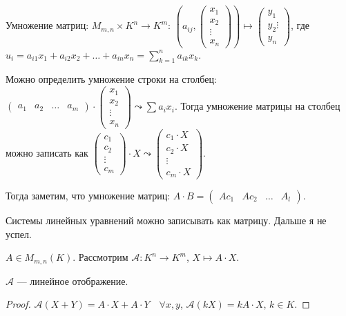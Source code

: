  \begin{definition}
     Умножение матриц: $M_{m, n} \times K^n \to K^m$: $(a_{ij}, \begin{pmatrix} x_1 \\ x_2 \\ \vdots \\ x_n \end{pmatrix}) \mapsto \begin{pmatrix} y_1 \\ y_2 \vdots \\ y_n \end{pmatrix}$, где $u_i = a_{i 1} x_1 + a_{i 2}x_2 + \ldots + a_{in}x_n = \sum\limits_{k=1}^n a_{ik}x_k$.

     Можно определить умножение строки на столбец:  $\begin{pmatrix} a_1 & a_2 & \ldots & a_m \end{pmatrix} \cdot \begin{pmatrix} x_1 \\ x_2 \\ \vdots \\ x_n\end{pmatrix} \leadsto \sum a_i x_i$.  Тогда умножение матрицы на столбец можно записать как $\begin{pmatrix} c_1 \\ c_2 \\ \vdots \\ c_m \end{pmatrix} \cdot X \leadsto \begin{pmatrix} c_1 \cdot X \\ c_2 \cdot X \\ \vdots \\ c_m \cdot X \end{pmatrix}$.

     Тогда заметим, что умножение матриц: $A \cdot B = \begin{pmatrix} Ac_1 & Ac_2 & \ldots  & A_l \end{pmatrix}$.
\end{definition}
\begin{example}[.СЛУ]
    Системы линейных уравнений можно записывать как матрицу. Дальше я не успел. 
\end{example}
\begin{remark}
    $A \in M_{m, n}(K)$. Рассмотрим  $\mathcal{A}\!: K^n \to K^m$,  $X \mapsto A \cdot X$.
\end{remark}
\begin{statement}
    $\mathcal{A}$ --- линейное отображение. 
\end{statement}
\begin{proof}
    $\mathcal{A}(X+Y) = A \cdot X + A \cdot Y\quad \forall x, y$,  $\mathcal{A}(kX) = kA\cdot X$,  $k \in K$.
\end{proof}

